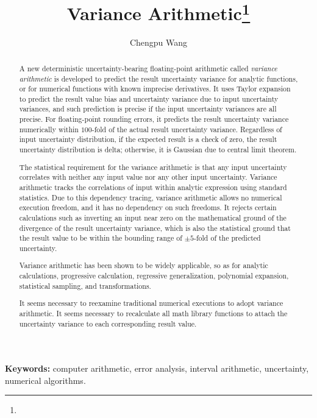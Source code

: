 \documentclass[twoside]{article}
\title{Variance Arithmetic\footnote{\whenaccepted}}
\author{Chengpu Wang
\institution{40 Grossman Street, Melville, NY 11747, USA}
\email{Chengpu@gmail.com}}
\date{}
\numberwithin{equation}{section}
\newcommand{\keywords}[1]{\small\textbf{Keywords: }#1}
\begin{document}
\maketitle
\begin{abstract}

A new deterministic uncertainty-bearing floating-point arithmetic called \emph{variance arithmetic} is developed to predict the result uncertainty variance for analytic functions, or for numerical functions with known imprecise derivatives. 
It uses Taylor expansion to predict the result value bias and uncertainty variance due to input uncertainty variances, and such prediction is precise if the input uncertainty variances are all precise.
For floating-point rounding errors, it predicts the result uncertainty variance numerically within $100$-fold of the actual result uncertainty variance.
Regardless of input uncertainty distribution, if the expected result is a check of zero, the result uncertainty distribution is delta; otherwise, it is Gaussian due to central limit theorem.

The statistical requirement for the variance arithmetic is that any input uncertainty correlates with neither any input value nor any other input uncertainty. 
Variance arithmetic tracks the correlations of input within analytic expression using standard statistics.
Due to this dependency tracing, variance arithmetic allows no numerical execution freedom, and it has no dependency on such freedoms.
It rejects certain calculations such as inverting an input near zero on the mathematical ground of the divergence of the result uncertainty variance, which is also the statistical ground that the result value to be within the bounding range of $\pm 5$-fold of the predicted uncertainty.

Variance arithmetic has been shown to be widely applicable, so as for analytic calculations, progressive calculation, regressive generalization, polynomial expansion, statistical sampling, and transformations.

It seems necessary to reexamine traditional numerical executions to adopt variance arithmetic.
It seems necessary to recalculate all math library functions to attach the uncertainty variance to each corresponding result value.

\end{abstract}
\keywords{computer arithmetic, error analysis, interval arithmetic, uncertainty, numerical algorithms.}
\end{document}
